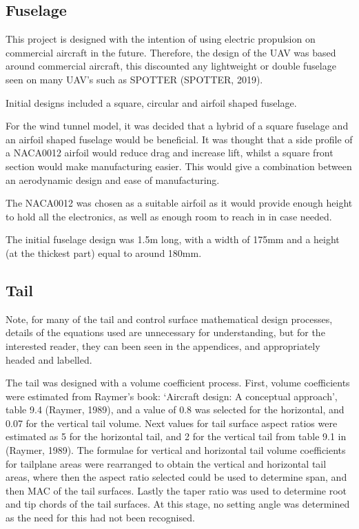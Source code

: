 \documentclass[../../main.tex]{subfiles}
\begin{document}

\subsection{Fuselage} \label{sec:design-process:initial-designs:fuselage}

This project is designed with the intention of using electric propulsion on commercial aircraft in the future.
Therefore, the design of the UAV was based around commercial aircraft, this discounted any lightweight or double fuselage seen on many UAV’s such as SPOTTER (SPOTTER, 2019). 

Initial designs included a square, circular and airfoil shaped fuselage.



For the wind tunnel model, it was decided that a hybrid of a square fuselage and an airfoil shaped fuselage would be beneficial.
It was thought that a side profile of a NACA0012 airfoil would reduce drag and increase lift, whilst a square front section would make manufacturing easier.
This would give a combination between an aerodynamic design and ease of manufacturing.  

The NACA0012 was chosen as a suitable airfoil as it would provide enough height to hold all the electronics, as well as enough room to reach in in case needed. 

The initial fuselage design was 1.5m long, with a width of 175mm and a height (at the thickest part) equal to around 180mm. 

\subsection{Tail} \label{sec:design-process:initial-designs:tail}

Note, for many of the tail and control surface mathematical design processes, details of the equations used are unnecessary for understanding, but for the interested reader, they can been seen in the appendices, and appropriately headed and labelled. 

The tail was designed with a volume coefficient process.
First, volume coefficients were estimated from Raymer’s book: ‘Aircraft design: A conceptual approach’, table 9.4 (Raymer, 1989), and a value of 0.8 was selected for the horizontal, and 0.07 for the vertical tail volume.
Next values for tail surface aspect ratios were estimated as 5 for the horizontal tail, and 2 for the vertical tail from table 9.1 in (Raymer, 1989).
The formulae for vertical and horizontal tail volume coefficients for tailplane areas were rearranged to obtain the vertical and horizontal tail areas, where then the aspect ratio selected could be used to determine span, and then MAC of the tail surfaces.
Lastly the taper ratio was used to determine root and tip chords of the tail surfaces.
At this stage, no setting angle was determined as the need for this had not been recognised. 
\end{document}
